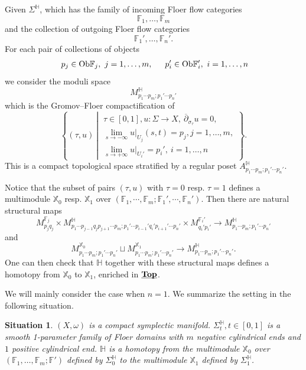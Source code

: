 \documentclass[reqno, 10pt]{amsart}
\numberwithin{equation}{section}
\numberwithin{equation}{section}
\newtheorem{situationh}{Situation}
\theoremstyle{definition}
\theoremstyle{remark}
\newcommand{\beqn}{\begin{equation*}}
\newcommand{\eeqn}{\end{equation*}}
\newcommand{\ov}{\overline}
\newcommand{\mb}{\mathbb}
\newcommand{\uds}[1]{\underline{\smash{#1}}}
\begin{document}
Given $\Sigma^{\mb H}$, which has the family of incoming Floer flow categories
\beqn
{\mb F}_1, \ldots, {\mb F}_m
\eeqn
and the collection of outgoing Floer flow categories 
\beqn
{\mb F}_1', \ldots, {\mb F}_n'.
\eeqn
For each pair of collections of objects 
\begin{align*}
&\ p_j \in {\rm Ob}{\mb F}_j,\ j = 1, \ldots, m,\ &\ p_i' \in {\rm Ob}{\mb F}_i',\ i=1, \ldots, n
\end{align*}
we consider the moduli space 
\beqn
M_{p_1 \cdots p_m; p_1' \cdots p_n'}^{\mb H}
\eeqn
which is the Gromov--Floer compactification of 
\beqn
\left\{ (\tau, u)\ \left|\ \begin{array}{l} \tau \in [0,1], u: \Sigma \to X,\   \ov\partial_{\sigma_\tau} u = 0,\\
\displaystyle \lim_{s \to -\infty} u|_{U_j} (s, t) =  p_j, j = 1, \ldots, m,\\
\displaystyle \lim_{s \to +\infty} u|_{U_i'} = p_i',\ i =1, \ldots, n  \end{array} \right. \right\}.
\eeqn
This is a compact topological space stratified by a regular poset $A_{p_1 \cdots p_m; p_1' \cdots p_n'}^{\mb H}$. 

Notice that the subset of pairs $(\tau, u)$ with $\tau = 0$ resp. $\tau =1$ defines a multimodule ${\mb X}_0$ resp. ${\mb X}_1$ over $({\mb F}_1, \cdots, {\mb F}_m; {\mb F}_1', \cdots, {\mb F}_n')$. Then there are natural structural maps
\beqn
M_{p_j q_j}^{{\mb F}_j} \times M_{p_1 \cdots p_{j-1} q_j p_{j+1} \cdots p_m; p_1' \cdots p_{i-1}' q_i' p_{i+1}' \cdots p_n'}^{\mb H} \times M_{q_i' p_i'}^{{\mb F}_i'} \to M_{p_1 \cdots p_m; p_1' \cdots p_n'}^{\mb H}
\eeqn
and 
\beqn
M_{p_1 \cdots p_m; p_1' \cdots p_n'}^{{\mb X}_0} \sqcup M_{p_1 \cdots p_m; p_1' \cdots p_n'}^{{\mb X}_1} \to M_{p_1\cdots p_m; p_1' \cdots p_n'}^{\mb H}.
\eeqn
One can then check that ${\mb H}$ together with these structural maps defines a homotopy from ${\mb X}_0$ to ${\mb X}_1$, enriched in $\uds{\bf Top}$.

We will mainly consider the case when $n=1$. We summarize the setting in the following situation.

\begin{situationh}\label{situationh1}
$(X, \omega)$ is a compact symplectic manifold. $\Sigma_t^{\mb H}, t \in [0, 1]$ is a smooth 1-parameter family of Floer domains with $m$ negative cylindrical ends and $1$ positive cylindrical end. ${\mb H}$ is a homotopy from the multimodule ${\mb X}_0$ over $({\mb F}_1, \ldots, {\mb F}_m; {\mb F}')$ defined by $\Sigma_0^{\mb H}$ to the multimodule ${\mb X}_1$ defined by $\Sigma_1^{\mb H}$. 
\end{situationh}
\end{document}
